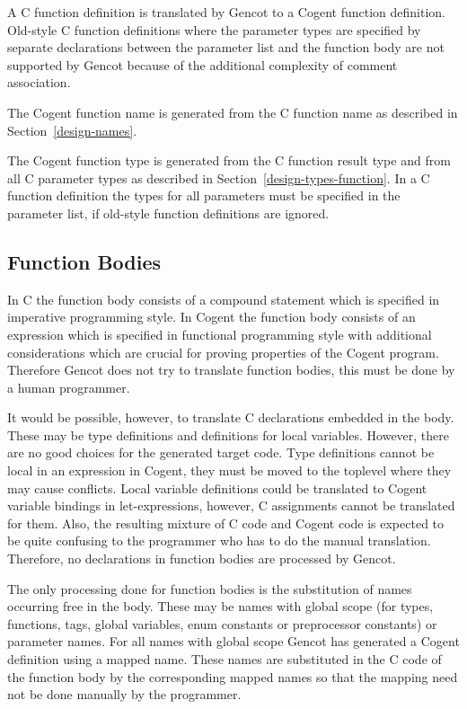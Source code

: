 
A C function definition is translated by Gencot to a Cogent function definition. Old-style C function definitions
where the parameter types are specified by separate declarations between the parameter list and the function body
are not supported by Gencot because of the additional complexity of comment association.

The Cogent function name is generated from the C function name as described in Section~\ref{design-names}.

The Cogent function type is generated from the C function result type and from all C parameter types as described
in Section~\ref{design-types-function}. In a C
function definition the types for all parameters must be specified in the parameter list, if old-style function
definitions are ignored.

\subsection{Function Bodies}

In C the function body consists of a compound statement which is specified in imperative programming style. In Cogent
the function body consists of an expression which is specified in functional programming style with additional 
considerations which are crucial for proving properties of the Cogent program. Therefore Gencot does not try
to translate function bodies, this must be done by a human programmer.

It would be possible, however, to translate C declarations embedded in the body. These may be type definitions
and definitions for local variables. However, there are no good choices for the generated target code. Type
definitions cannot be local in an expression in Cogent, they must be moved to the toplevel where they may cause
conflicts. Local variable definitions could be translated to Cogent variable bindings in let-expressions, however,
C assignments cannot be translated for them. Also, the resulting mixture of C code and Cogent code is expected 
to be quite confusing to the programmer who has to do the manual translation. Therefore, no declarations in 
function bodies are processed by Gencot.

The only processing done for function bodies is the substitution of names occurring free in the body. These may
be names with global scope (for types, functions, tags, global variables, enum constants or preprocessor constants)
or parameter names. For all names with global scope Gencot has generated a Cogent definition using a mapped name.
These names are substituted in the C code of the function body by the corresponding mapped names so that the 
mapping need not be done manually by the programmer.


